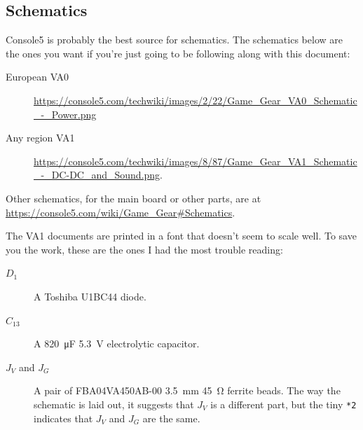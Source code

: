 \documentclass{article}
\begin{document}
\subsection{Schematics}
\label{sec:documents_schematics}
Console5 is probably the best source for schematics. The schematics
below are the ones you want if you're just going to be following along
with this document:
\begin{description}
\item[European VA0]
  \url{https://console5.com/techwiki/images/2/22/Game_Gear_VA0_Schematic_-_Power.png}
\item[Any region VA1]
  \url{https://console5.com/techwiki/images/8/87/Game_Gear_VA1_Schematic_-_DC-DC_and_Sound.png}.
\end{description}

Other schematics, for the main board or other parts, are at
\url{https://console5.com/wiki/Game_Gear#Schematics}.

The VA1 documents are printed in a font that doesn't seem to scale
well. To save you the work, these are the ones I had the most trouble
reading:

\begin{description}
\item[$D_1$] A Toshiba U1BC44 diode.
\item[$C_{13}$] A \qty{820}{\micro\farad} \qty{5.3}{\volt}
  electrolytic capacitor.
  
\item[$J_V$ and $J_G$] A pair of FBA04VA450AB-00
  \qty{3.5}{\milli\meter} \qty{45}{\ohm} ferrite beads. The way the
  schematic is laid out, it suggests that $J_V$ is a different part,
  but the tiny \texttt{*2} indicates that $J_V$ and $J_G$ are the same.
\end{description}
\end{document}
